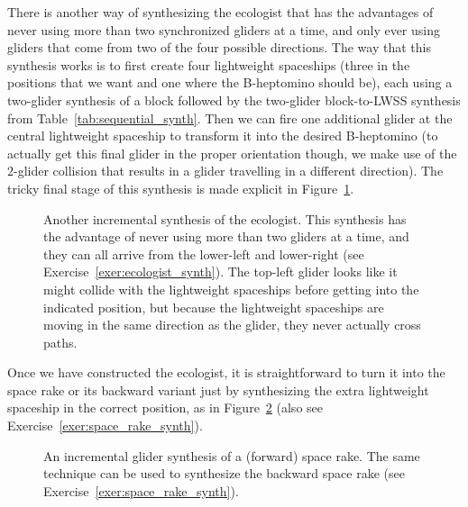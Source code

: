 There is another way of synthesizing the ecologist that has the advantages of never using more than two synchronized gliders at a time, and only ever using gliders that come from two of the four possible directions. The way that this synthesis works is to first create four lightweight spaceships (three in the positions that we want and one where the B-heptomino should be), each using a two-glider synthesis of a block followed by the two-glider block-to-LWSS synthesis from Table~\ref{tab:sequential_synth}. Then we can fire one additional glider at the central lightweight spaceship to transform it into the desired B-heptomino (to actually get this final glider in the proper orientation though, we make use of the $2$-glider collision that results in a glider travelling in a different direction). The tricky final stage of this synthesis is made explicit in Figure~\ref{fig:ecologist_synth_b}.

\begin{figure}[!ht]
	\centering
	
	\caption{Another incremental synthesis of the ecologist. This synthesis has the advantage of never using more than two gliders at a time, and they can all arrive from the lower-left and lower-right (see Exercise~\ref{exer:ecologist_synth}). The top-left glider looks like it might collide with the lightweight spaceships before getting into the indicated position, but because the lightweight spaceships are moving in the same direction as the glider, they never actually cross paths.}\label{fig:ecologist_synth_b}
\end{figure}

Once we have constructed the ecologist, it is straightforward to turn it into the space rake or its backward variant just by synthesizing the extra lightweight spaceship in the correct position, as in Figure~\ref{fig:space_rake_synth} (also see Exercise~\ref{exer:space_rake_synth}). %

\begin{figure}[!ht]
	\centering
	
	\caption{An incremental glider synthesis of a (forward) space rake. The same technique can be used to synthesize the backward space rake (see Exercise~\ref{exer:space_rake_synth}).}\label{fig:space_rake_synth}
\end{figure}



